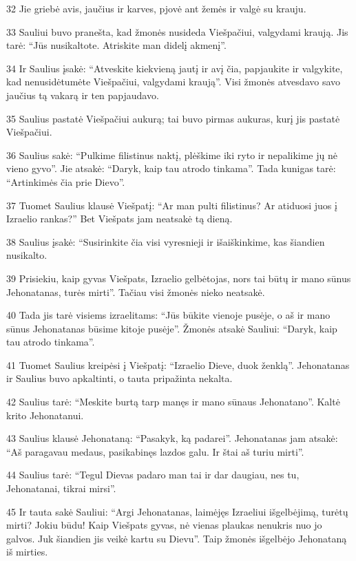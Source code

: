 \par 32 Jie griebė avis, jaučius ir karves, pjovė ant žemės ir valgė su krauju. 
\par 33 Sauliui buvo pranešta, kad žmonės nusideda Viešpačiui, valgydami kraują. Jis tarė: “Jūs nusikaltote. Atriskite man didelį akmenį”. 
\par 34 Ir Saulius įsakė: “Atveskite kiekvieną jautį ir avį čia, papjaukite ir valgykite, kad nenusidėtumėte Viešpačiui, valgydami kraują”. Visi žmonės atvesdavo savo jaučius tą vakarą ir ten papjaudavo. 
\par 35 Saulius pastatė Viešpačiui aukurą; tai buvo pirmas aukuras, kurį jis pastatė Viešpačiui. 
\par 36 Saulius sakė: “Pulkime filistinus naktį, plėškime iki ryto ir nepalikime jų nė vieno gyvo”. Jie atsakė: “Daryk, kaip tau atrodo tinkama”. Tada kunigas tarė: “Artinkimės čia prie Dievo”. 
\par 37 Tuomet Saulius klausė Viešpatį: “Ar man pulti filistinus? Ar atiduosi juos į Izraelio rankas?” Bet Viešpats jam neatsakė tą dieną. 
\par 38 Saulius įsakė: “Susirinkite čia visi vyresnieji ir išaiškinkime, kas šiandien nusikalto. 
\par 39 Prisiekiu, kaip gyvas Viešpats, Izraelio gelbėtojas, nors tai būtų ir mano sūnus Jehonatanas, turės mirti”. Tačiau visi žmonės nieko neatsakė. 
\par 40 Tada jis tarė visiems izraelitams: “Jūs būkite vienoje pusėje, o aš ir mano sūnus Jehonatanas būsime kitoje pusėje”. Žmonės atsakė Sauliui: “Daryk, kaip tau atrodo tinkama”. 
\par 41 Tuomet Saulius kreipėsi į Viešpatį: “Izraelio Dieve, duok ženklą”. Jehonatanas ir Saulius buvo apkaltinti, o tauta pripažinta nekalta. 
\par 42 Saulius tarė: “Meskite burtą tarp manęs ir mano sūnaus Jehonatano”. Kaltė krito Jehonatanui. 
\par 43 Saulius klausė Jehonataną: “Pasakyk, ką padarei”. Jehonatanas jam atsakė: “Aš paragavau medaus, pasikabinęs lazdos galu. Ir štai aš turiu mirti”. 
\par 44 Saulius tarė: “Tegul Dievas padaro man tai ir dar daugiau, nes tu, Jehonatanai, tikrai mirsi”. 
\par 45 Ir tauta sakė Sauliui: “Argi Jehonatanas, laimėjęs Izraeliui išgelbėjimą, turėtų mirti? Jokiu būdu! Kaip Viešpats gyvas, nė vienas plaukas nenukris nuo jo galvos. Juk šiandien jis veikė kartu su Dievu”. Taip žmonės išgelbėjo Jehonataną iš mirties. 
